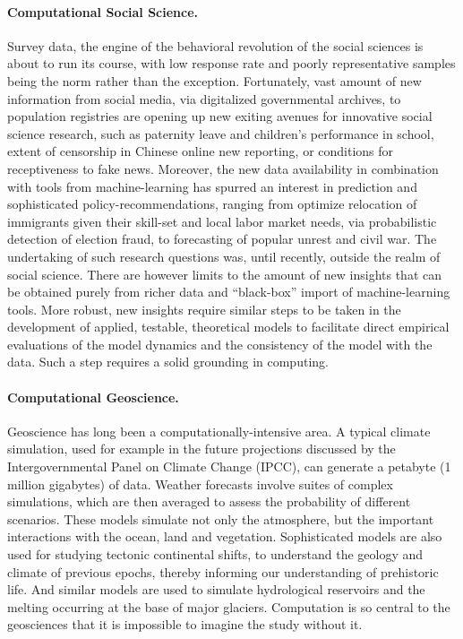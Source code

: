 \documentclass[%
oneside,                 %
final,                   %
10pt]{article}
\begin{document}
\paragraph{Computational Social Science.}
Survey data, the engine of the behavioral revolution of the social sciences is about to run its course, with low response rate and poorly representative samples being the norm rather than the exception.  Fortunately, vast amount of new information from social media, via digitalized governmental archives, to population registries are opening up new exiting avenues for innovative social science research, such as paternity leave and children’s performance in school, extent of censorship in Chinese online new reporting, or conditions for receptiveness to fake news. Moreover, the new data availability in combination with tools from machine-learning has spurred an interest in prediction and sophisticated policy-recommendations, ranging from optimize relocation of immigrants given their skill-set and local labor market needs, via probabilistic detection of election fraud, to forecasting of popular unrest and civil war. The undertaking of such research questions was, until recently, outside the realm of social science. There are however limits to the amount of new insights that can be obtained purely from richer data and “black-box” import of machine-learning tools. More robust, new insights require similar steps to be taken in the development of applied, testable, theoretical models to facilitate direct empirical evaluations of the model dynamics and the consistency of the model with the data. Such a step requires a solid grounding in computing.



\paragraph{Computational Geoscience.}
Geoscience has long been a computationally-intensive area. A typical
climate simulation, used for example in the future projections
discussed by the Intergovernmental Panel on Climate Change (IPCC), can
generate a petabyte (1 million gigabytes) of data. Weather forecasts
involve suites of complex simulations, which are then averaged to
assess the probability of different scenarios. These models simulate
not only the atmosphere, but the important interactions with the
ocean, land and vegetation. Sophisticated models are also used for
studying tectonic continental shifts, to understand the geology and
climate of previous epochs, thereby informing our understanding of
prehistoric life. And similar models are used to simulate hydrological
reservoirs and the melting occurring at the base of major
glaciers. Computation is so central to the geosciences that it is
impossible to imagine the study without it.
\end{document}
